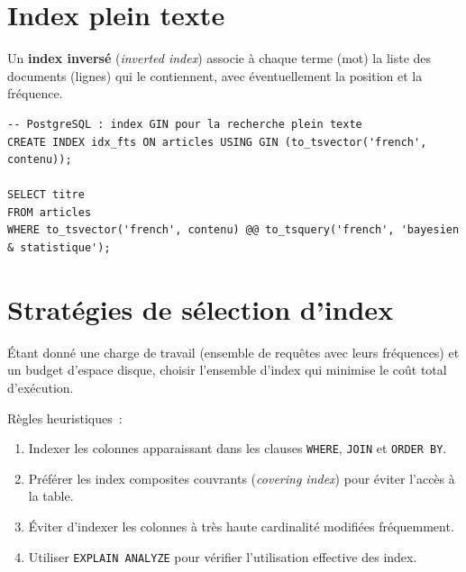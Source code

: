 \section{Index plein texte}

\begin{definition}
Un \textbf{index invers\'e} (\emph{inverted index}) associe \`a chaque
terme (mot) la liste des documents (lignes) qui le contiennent, avec
\'eventuellement la position et la fr\'equence.
\end{definition}

\begin{exemple}
\begin{verbatim}
-- PostgreSQL : index GIN pour la recherche plein texte
CREATE INDEX idx_fts ON articles USING GIN (to_tsvector('french', contenu));

SELECT titre
FROM articles
WHERE to_tsvector('french', contenu) @@ to_tsquery('french', 'bayesien & statistique');
\end{verbatim}
\end{exemple}

\section{Strat\'egies de s\'election d'index}

\begin{definition}
\'Etant donn\'e une charge de travail (ensemble de requ\^etes avec leurs
fr\'equences) et un budget d'espace disque, choisir l'ensemble d'index
qui minimise le co\^ut total d'ex\'ecution.
\end{definition}

R\`egles heuristiques~:
\begin{enumerate}
  \item Indexer les colonnes apparaissant dans les clauses \texttt{WHERE},
        \texttt{JOIN} et \texttt{ORDER BY}.
  \item Pr\'ef\'erer les index composites couvrants (\emph{covering index})
        pour \'eviter l'acc\`es \`a la table.
  \item \'Eviter d'indexer les colonnes \`a tr\`es haute cardinalit\'e
        modifi\'ees fr\'equemment.
  \item Utiliser \texttt{EXPLAIN ANALYZE} pour v\'erifier l'utilisation
        effective des index.
\end{enumerate}

